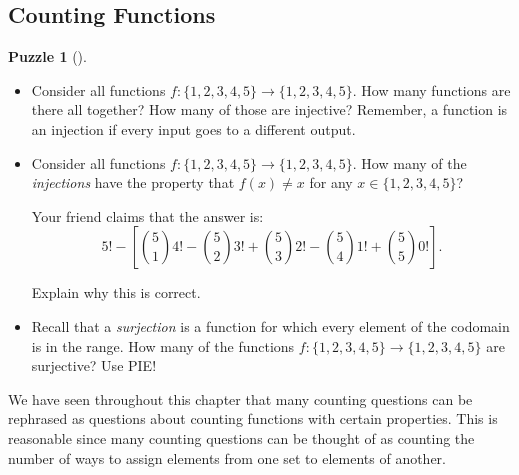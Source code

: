 \documentclass[10pt,]{book}
\theoremstyle{plain}
\theoremstyle{definition}
\theoremstyle{definition}
\theoremstyle{definition}
\newtheorem{investigation}[project]{Puzzle}
\numberwithin{equation}{chapter}
\begin{document}
\subsection[{Counting Functions}]{Counting Functions}\label{subsection-25}
\begin{investigation}[]\label{investigation-10}
\hypertarget{p-1105}{}%
%
\begin{itemize}[label=\textbullet]
\item{}\hypertarget{p-1106}{}%
Consider all functions \(f: \{1,2,3,4,5\} \to \{1,2,3,4,5\}\). How many functions are there all together? How many of those are injective? Remember, a function is an injection if every input goes to a different output.%
\item{}\hypertarget{p-1107}{}%
Consider all functions \(f: \{1,2,3,4,5\} \to \{1,2,3,4,5\}\). How many of the \emph{injections} have the property that \(f(x) \ne x\) for any \(x \in \{1,2,3,4,5\}\)?%
\par
\hypertarget{p-1108}{}%
Your friend claims that the answer is:%
\begin{equation*}
5! - \left[ {5\choose 1}4! - {5 \choose 2}3! + {5\choose 3}2! - {5 \choose 4}1! + {5\choose 5}0! \right].
\end{equation*}
%
\par
\hypertarget{p-1109}{}%
Explain why this is correct.%
\item{}\hypertarget{p-1110}{}%
Recall that a \emph{surjection} is a function for which every element of the codomain is in the range. How many of the functions \(f: \{1,2,3,4,5\} \to \{1,2,3,4,5\}\) are surjective? Use PIE!%
\end{itemize}
%
\end{investigation}
\hypertarget{p-1111}{}%
We have seen throughout this chapter that many counting questions can be rephrased as questions about counting functions with certain properties.  This is reasonable since many counting questions can be thought of as counting the number of ways to assign elements from one set to elements of another.%
\end{document}
